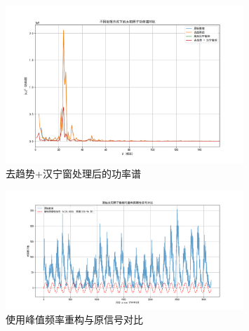 \begin{figure}[H]
    \centering
    \includegraphics[width=0.8\textwidth]{Problem_2/figs/spectrum.png}
    \caption{去趋势+汉宁窗处理后的功率谱}
\end{figure}

\begin{figure}[H]
    \centering
    \includegraphics[width=0.8\textwidth]{Problem_2/figs/reconst.png}
    \caption{使用峰值频率重构与原信号对比}
\end{figure}
